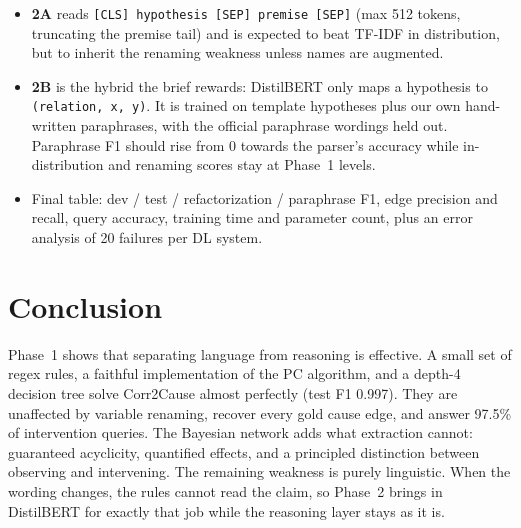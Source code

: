 \documentclass[12pt,a4paper]{article}
\newcommand{\code}[1]{\texttt{#1}}
\begin{document}
\begin{itemize}
  \item \textbf{2A} reads \code{[CLS] hypothesis [SEP] premise [SEP]} (max 512 tokens, truncating the premise tail) and is
        expected to beat TF-IDF in distribution, but to inherit the renaming weakness unless names are augmented.
  \item \textbf{2B} is the hybrid the brief rewards: DistilBERT only maps a hypothesis to \code{(relation, x, y)}. It is trained
        on template hypotheses plus our own hand-written paraphrases, with the official paraphrase wordings held out. Paraphrase
        F1 should rise from 0 towards the parser's accuracy while in-distribution and renaming scores stay at Phase~1 levels.
  \item Final table: dev / test / refactorization / paraphrase F1, edge precision and recall, query accuracy, training time and
        parameter count, plus an error analysis of 20 failures per DL system.
\end{itemize}

\section{Conclusion}
Phase~1 shows that separating language from reasoning is effective. A small set of regex rules, a faithful
implementation of the PC algorithm, and a depth-4 decision tree solve Corr2Cause almost perfectly (test F1 0.997). They
are unaffected by variable renaming, recover every gold cause edge, and answer 97.5\% of intervention queries. The
Bayesian network adds what extraction cannot: guaranteed acyclicity, quantified effects, and a principled distinction
between observing and intervening. The remaining weakness is purely linguistic. When the wording changes, the rules
cannot read the claim, so Phase~2 brings in DistilBERT for exactly that job while the reasoning layer stays as it is.

\end{document}
